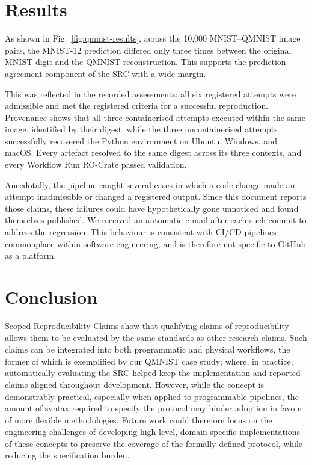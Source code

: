 \documentclass[conference,a4paper]{IEEEtran}
\newlength{\PaperStrokeWidth}
\begin{document}
\section{Results}


As shown in Fig.~\ref{fig:qmnist-results}, across the 10,000 MNIST--QMNIST image pairs, the MNIST-12 prediction differed only three times between the original MNIST digit and the QMNIST reconstruction. This supports the prediction-agreement component of the SRC with a wide margin.

This was reflected in the recorded assessments: all six registered
attempts were admissible and met the registered criteria for a successful reproduction. Provenance shows that all three containerised attempts executed within the same image, identified by their digest, while the three uncontainerised attempts successfully recovered the Python environment on Ubuntu, Windows, and macOS. Every artefact resolved to the same digest across its three contexts, and every Workflow Run RO-Crate passed validation. 

Anecdotally, the pipeline caught several cases in which a code change made an attempt inadmissible or changed a registered output. Since this document reports those claims, these failures could have hypothetically gone unnoticed and found themselves published. We received an automatic e-mail after each such commit to address the regression. This behaviour is consistent with CI/CD pipelines commonplace within software engineering, and is therefore not specific to GitHub as a platform.

\section{Conclusion}

Scoped Reproducibility Claims show that qualifying claims of reproducibility allows them to be evaluated by the same standards as other research claims. Such claims can be integrated into both programmatic and physical workflows, the former of which is exemplified by our QMNIST case study; where, in practice, automatically evaluating the SRC helped keep the implementation and reported claims aligned throughout development. However, while the concept is demonstrably practical, especially when applied to programmable pipelines, the amount of syntax required to specify the protocol may hinder adoption in favour of more flexible methodologies. Future work could therefore focus on the engineering challenges of developing high-level, domain-specific implementations of these concepts to preserve the coverage of the formally defined protocol, while reducing the specification burden.

\printbibliography
\end{document}
